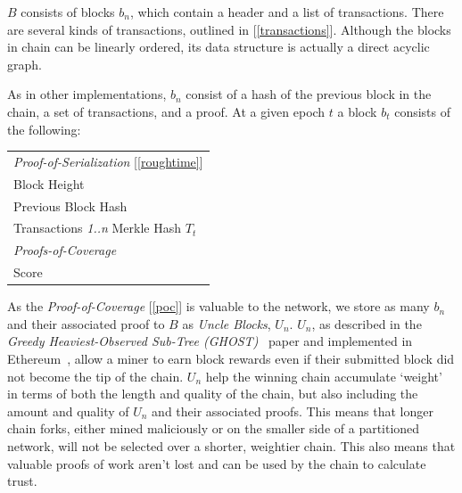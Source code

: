 \documentclass[letterpaper,11pt]{article}
\begin{document}
$B$ consists of blocks $b_n$, which contain a header and a list of transactions. There are several kinds of transactions, outlined in [\ref{transactions}]. Although the blocks in chain can be linearly ordered, its data structure is actually a direct acyclic graph.

As in other implementations, $b_n$ consist of a hash of the previous block in the chain, a set of transactions, and a proof. At a given epoch $t$ a block $b_t$ consists of the following:

\begin{center}
    \begin{tabular}{l}
         \emph{Proof-of-Serialization} [\ref{roughtime}]\\
         Block Height \\
         Previous Block Hash \\
         Transactions \emph{1..n} Merkle Hash $T_t$ \\
         \emph{Proofs-of-Coverage} \\
         Score \\
    \end{tabular}
\end{center}

As the \emph{Proof-of-Coverage} [\ref{poc}] is valuable to the network, we store as many $b_n$ and their associated proof to $B$ as \emph{Uncle Blocks}, $U_n$. $U_n$, as described in the \emph{Greedy Heaviest-Observed Sub-Tree (GHOST)}~\cite{ghost} paper and implemented in Ethereum~\cite{ethereum}, allow a miner to earn block rewards even if their submitted block did not become the tip of the chain. $U_n$ help the winning chain accumulate `weight' in terms of both the length and quality of the chain, but also including the amount and quality of $U_n$ and their associated proofs. This means that longer chain forks, either mined maliciously or on the smaller side of a partitioned network, will not be selected over a shorter, weightier chain. This also means that valuable proofs of work aren't lost and can be used by the chain to calculate trust.
\end{document}
